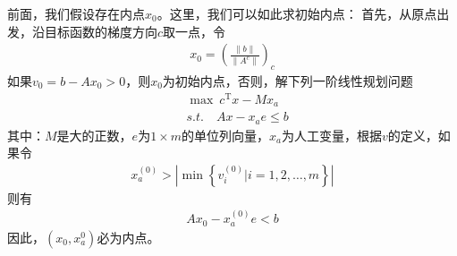         \par
        前面，我们假设存在内点$x_0$。这里，我们可以如此求初始内点：
        首先，从原点出发，沿目标函数的梯度方向$c$取一点，令
        \begin{align*}
        x_0 = \left( \frac{\|b\|}{\|A^c\|} \right) _c
        \end{align*}
        如果$v_0=b-Ax_0>0$，则$x_0$为初始内点，否则，解下列一阶线性规划问题
        \begin{align*}
        & \mathop{\max}\  c^\mathrm{T} x-Mx_a\\
        &s.t.\quad Ax-x_ae \leqslant b
        \end{align*}
        其中：$M$是大的正数，$e$为$1\times m$的单位列向量，$x_a$为人工变量，根据$v$的定义，如果令
        \begin{align*}
        x_a^{(0)} > \left| {\min} \left\{{v_i^{(0)}}\big|i = 1,2,\ldots,m\right\}\right|
        \end{align*}
        则有
        \begin{align*}
        Ax_0- x_a^{(0)}e < b
        \end{align*}
        因此，$(x_0,x_a^{0})$必为内点。
